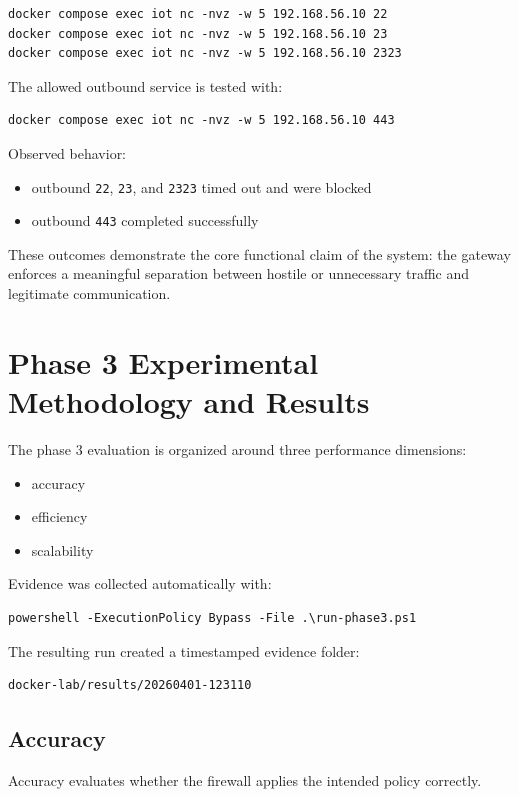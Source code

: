 \documentclass[journal]{IEEEtran}
\begin{document}
\begin{lstlisting}
docker compose exec iot nc -nvz -w 5 192.168.56.10 22
docker compose exec iot nc -nvz -w 5 192.168.56.10 23
docker compose exec iot nc -nvz -w 5 192.168.56.10 2323
\end{lstlisting}

The allowed outbound service is tested with:

\begin{lstlisting}
docker compose exec iot nc -nvz -w 5 192.168.56.10 443
\end{lstlisting}

Observed behavior:
\begin{itemize}
\item outbound \texttt{22}, \texttt{23}, and \texttt{2323} timed out and were blocked
\item outbound \texttt{443} completed successfully
\end{itemize}

These outcomes demonstrate the core functional claim of the system: the gateway enforces a meaningful separation between hostile or unnecessary traffic and legitimate communication.

\section{Phase 3 Experimental Methodology and Results}
The phase 3 evaluation is organized around three performance dimensions:
\begin{itemize}
\item accuracy
\item efficiency
\item scalability
\end{itemize}

Evidence was collected automatically with:

\begin{lstlisting}
powershell -ExecutionPolicy Bypass -File .\run-phase3.ps1
\end{lstlisting}

The resulting run created a timestamped evidence folder:

\begin{lstlisting}
docker-lab/results/20260401-123110
\end{lstlisting}

\subsection{Accuracy}
Accuracy evaluates whether the firewall applies the intended policy correctly.
\end{document}
